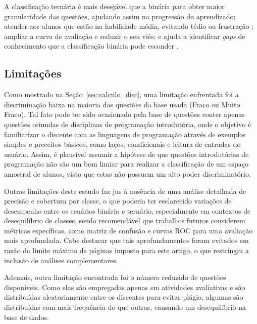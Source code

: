 \documentclass[12pt]{article}
\begin{document}
A classificação ternária é mais desejável que a binária para obter maior granularidade das questões, ajudando assim na progressão do aprendizado; atender aos alunos que estão na habilidade média, evitando tédio ou frustração \cite{whalley2014}; ampliar a curva de avaliação e reduzir o seu viés; e ajuda a identificar \textit{gaps} de conhecimento que a classificação binária pode esconder \cite{barbosa2023}.


\subsection{Limitações} \label{sec:limitacoes}

Como mostrado na Seção~\ref{sec:calculo_disc}, uma limitação enfrentada foi a discriminação baixa na maioria das questões da base usada (Fraco ou Muito Fraco). Tal fato pode ter sido ocasionado pela base de questões conter apenas questões oriundas de disciplinas de programação introdutória, onde o objetivo é familiarizar o discente com as linguagens de programação através de exemplos simples e preceitos básicos, como laços, condicionais e leitura de entradas do usuário. Assim, é plausível assumir a hipótese de que questões introdutórias de programação não são um bom limiar para realizar a classificação de um espaço amostral de alunos, visto que estas não possuem um alto poder discriminatório. %

Outras limitações deste estudo faz jus à ausência de uma análise detalhada de precisão e cobertura por classe, o que poderia ter esclarecido variações de desempenho entre os cenários binário e ternário, especialmente em contextos de desequilíbrio de classes, sendo recomendável que trabalhos futuros considerem métricas específicas, como matriz de confusão e curvas ROC para uma avaliação mais aprofundada. Cabe destacar que tais aprofundamentos foram evitados em razão do limite máximo de páginas imposto para este artigo, o que restringiu a inclusão de análises complementares.

Ademais, outra limitação encontrada foi o número reduzido de questões disponíveis. Como elas são empregadas apenas em atividades avaliativas e são distribuídas aleatoriamente entre os discentes para evitar plágio, algumas são distribuídas com mais frequência do que outras, causando um desequilíbrio na base de dados.
\end{document}
